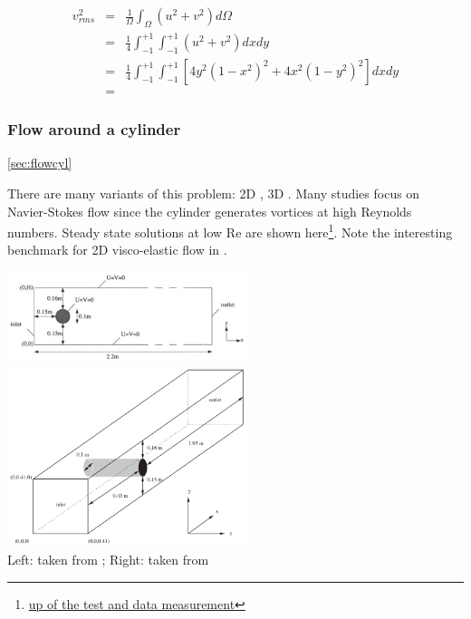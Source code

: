 \begin{eqnarray}
v_{rms}^2 
&=& \frac{1}{\Omega} \int_\Omega (u^2+v^2) d\Omega \nonumber\\
&=& \frac{1}{4} \int_{-1}^{+1}\int_{-1}^{+1} (u^2+v^2) dxdy \nonumber\\
&=& \frac{1}{4} \int_{-1}^{+1}\int_{-1}^{+1} [ 4y^2(1-x^2)^2 + 4x^2(1-y^2)^2   ] dxdy \nonumber\\
&=& 
\end{eqnarray}




\subsubsection{Flow around a cylinder} \ref{sec:flowcyl}

There are many variants of this problem: 2D \cite{turek}, 3D \cite{john02}.
Many studies focus on Navier-Stokes flow since the cylinder generates
vortices at high Reynolds numbers. Steady state solutions at low Re are shown 
here\footnote{\url{up of the test and data measurement}}.
Note the interesting benchmark for 2D visco-elastic flow in \cite{bepo10}.

\begin{center}
\includegraphics[width=7cm]{images/benchmark_flow_cylinder/turek}
\includegraphics[width=7cm]{images/benchmark_flow_cylinder/john02}\\
{\captionfont Left: taken from \cite{turek}; Right: taken from \cite{john02}}
\end{center}


